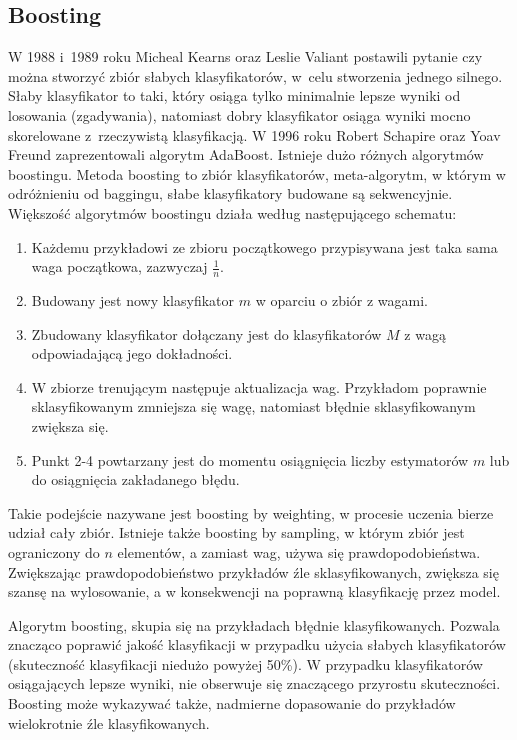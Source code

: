 \subsection{Boosting}
W 1988 i 1989 roku Micheal Kearns oraz Leslie Valiant postawili pytanie czy można stworzyć zbiór słabych klasyfikatorów, w celu stworzenia jednego silnego. Słaby klasyfikator to taki, który osiąga tylko minimalnie lepsze wyniki od losowania (zgadywania), natomiast dobry klasyfikator osiąga wyniki mocno skorelowane z rzeczywistą klasyfikacją. W 1996 roku Robert Schapire oraz Yoav Freund zaprezentowali algorytm AdaBoost. Istnieje dużo różnych algorytmów boostingu. 
Metoda boosting to zbiór klasyfikatorów, meta-algorytm, w którym w odróżnieniu od baggingu, słabe klasyfikatory budowane są sekwencyjnie. Większość algorytmów boostingu działa według następującego schematu:
\begin{enumerate}
	\item Każdemu przykładowi ze zbioru początkowego przypisywana jest taka sama waga początkowa, zazwyczaj $\frac{1}{n}$.
	\item Budowany jest nowy klasyfikator $m$ w oparciu o zbiór z wagami.
	\item Zbudowany klasyfikator dołączany jest do klasyfikatorów $M$ z wagą odpowiadającą jego dokładności.
	\item W zbiorze trenującym następuje aktualizacja wag. Przykładom poprawnie sklasyfikowanym zmniejsza się wagę, natomiast  błędnie sklasyfikowanym zwiększa się.
	\item Punkt 2-4 powtarzany jest do momentu osiągnięcia liczby estymatorów $m$ lub do osiągnięcia zakładanego błędu. 
\end{enumerate}
Takie podejście nazywane jest boosting by weighting, w procesie uczenia bierze udział cały zbiór. Istnieje także boosting by sampling, w którym zbiór jest ograniczony do $n$ elementów, a zamiast wag, używa się prawdopodobieństwa. Zwiększając prawdopodobieństwo przykładów źle sklasyfikowanych, zwiększa się szansę na wylosowanie, a w konsekwencji na poprawną klasyfikację przez model. \par
Algorytm boosting, skupia się na przykładach błędnie klasyfikowanych. Pozwala znacząco poprawić jakość klasyfikacji w przypadku użycia słabych klasyfikatorów (skuteczność klasyfikacji niedużo powyżej 50\%). W przypadku klasyfikatorów osiągających lepsze wyniki, nie obserwuje się znaczącego przyrostu skuteczności. Boosting może wykazywać także, nadmierne dopasowanie do przykładów wielokrotnie źle klasyfikowanych. \par
